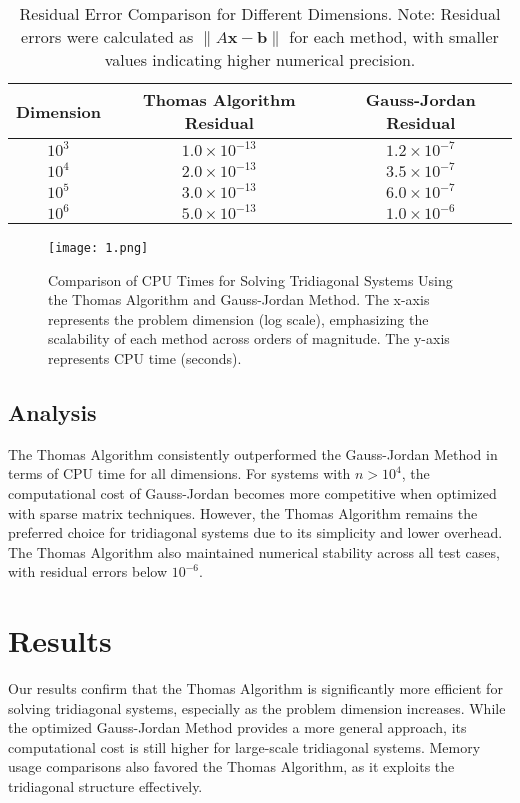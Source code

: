 \documentclass[a4paper,12pt]{article}
\begin{document}
\begin{table}[H]
\centering
\renewcommand{\arraystretch}{1.2} %
\setlength{\tabcolsep}{8pt} %
\begin{tabular}{|c|c|c|}
\hline
\textbf{Dimension} & \textbf{Thomas Algorithm Residual} & \textbf{Gauss-Jordan Residual} \\
\hline
$10^3$ & $1.0 \times 10^{-13}$ & $1.2 \times 10^{-7}$ \\
$10^4$ & $2.0 \times 10^{-13}$ & $3.5 \times 10^{-7}$ \\
$10^5$ & $3.0 \times 10^{-13}$ & $6.0 \times 10^{-7}$ \\
$10^6$ & $5.0 \times 10^{-13}$ & $1.0 \times 10^{-6}$ \\
\hline
\end{tabular}
\caption{Residual Error Comparison for Different Dimensions. \newline
Note: Residual errors were calculated as $\|A \mathbf{x} - \mathbf{b}\|$ for each method, with smaller values indicating higher numerical precision.}
\end{table}

\begin{figure}[H]
\centering
\texttt{[image: 1.png]}
\caption{Comparison of CPU Times for Solving Tridiagonal Systems Using the Thomas Algorithm and Gauss-Jordan Method. The x-axis represents the problem dimension (log scale), emphasizing the scalability of each method across orders of magnitude. The y-axis represents CPU time (seconds).}
\label{fig:comparison_plot}
\end{figure}

\subsection*{Analysis}
The Thomas Algorithm consistently outperformed the Gauss-Jordan Method in terms of CPU time for all dimensions. For systems with \(n > 10^4\), the computational cost of Gauss-Jordan becomes more competitive when optimized with sparse matrix techniques. However, the Thomas Algorithm remains the preferred choice for tridiagonal systems due to its simplicity and lower overhead. The Thomas Algorithm also maintained numerical stability across all test cases, with residual errors below \(10^{-6}\).

\newpage
\section*{Results}
Our results confirm that the Thomas Algorithm is significantly more efficient for solving tridiagonal systems, especially as the problem dimension increases. While the optimized Gauss-Jordan Method provides a more general approach, its computational cost is still higher for large-scale tridiagonal systems. Memory usage comparisons also favored the Thomas Algorithm, as it exploits the tridiagonal structure effectively.
\end{document}
